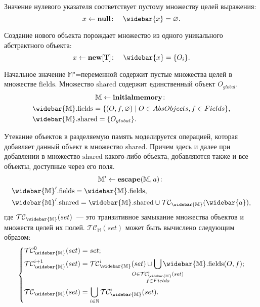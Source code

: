 \documentclass[14pt,titlepage,draft]{extarticle}
\newcommand{\M}{\ensuremath{\mathbb{M}}}
\newcommand{\Ms}{\ensuremath{\mathbb{\widebar{M}}}}
\newcommand{\Mf}[1]{\ensuremath{\mathrm{#1}}}
\newcommand{\type}[1]{\mathrm{#1}}
\newcommand{\op}[1]{\mathbf{#1}}
\newcommand{\pts}[1]{\widebar{#1}}
\newcommand{\AO}{O}
\newcommand{\AOGlobal}{\AO_{global}}
\newcommand{\TClosure}{\mathcal{TC}}
\begin{document}
    Значение нулевого указателя соответствует пустому множеству целей
    выражения:
    \[
      x \gets \op{null} \colon \quad
      \pts{x} = \emptyset.
    \]

    Создание нового объекта порождает множество из одного уникального
    абстрактного объекта:
    \[
      x \gets \op{new}[\type{T}] \colon \quad
      \pts{x} = \{\AO_i\}.
    \]

    Начальное значение \M"=переменной содержит пустые множества целей в
    множестве \Mf{fields}. Множество \Mf{shared}
    содержит единственный объект $\AOGlobal$.
    \begin{gather*}
      \M \gets \op{initialmemory} \colon \\
      \begin{aligned}
        &\Ms.\Mf{fields} = \{ (\AO, f, \emptyset) \mid
          \AO \in AbsObjects, f \in Fields \}, \\
        &\Ms.\Mf{shared} = \{\AOGlobal\}.
      \end{aligned}
    \end{gather*}

    Утекание объектов в разделяемую память моделируется операцией, которая
    добавляет данный объект в множество \Mf{shared}. Причем здесь и далее
    при добавлении в множество \Mf{shared} какого-либо объекта, добавляются
    также и все объекты, доступные через его поля.
    \begin{gather*}
      \M' \gets \op{escape}(\M, a) \colon \\
      \begin{aligned}
        &\Ms'.\Mf{fields} = \Ms.\Mf{fields}, \\
        &\Ms'.\Mf{shared} = \Ms.\Mf{shared} \cup \TClosure_\Ms(\pts{a}),
      \end{aligned}
    \end{gather*}
    где $\TClosure_\Ms(set)$~--- это транзитивное замыкание  множества объектов и множеств целей их полей.
    $\TClosure_\M(set)$ может быть вычислено следующим образом:
    \[\left\{\begin{aligned}
      &\TClosure_\Ms^0(set) = set; \\
      &\TClosure_\Ms^{i+1}(set) = \TClosure_\Ms^i(set) \cup
        \smashoperator{\bigcup_{\substack{\AO \in \TClosure_\Ms^i(set)\\
                           f \in Fields}}}
          \Ms.\Mf{fields}(\AO, f); \\
      &\TClosure_\Ms(set) =
        \bigcup_{i \in \mathbb{N}} \TClosure_\Ms^i(set).
    \end{aligned}\right.\]
\end{document}
